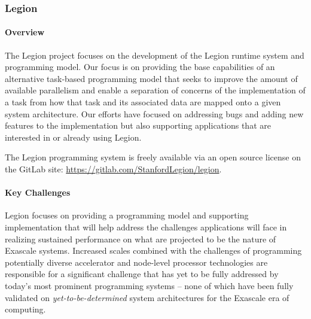 \subsubsection{ Legion}

\paragraph{Overview}
The Legion project focuses on the development of the Legion runtime system and programming
model. Our focus is on providing the base capabilities of an alternative task-based 
programming model that seeks to improve the amount of available parallelism and enable a 
separation of concerns of the implementation of a task from how that task and its 
associated data are mapped onto a given system architecture.  Our efforts have focused on 
addressing bugs and adding new features to the implementation but also supporting 
applications that are interested in or already using Legion. 

The Legion programming system is freely available via an open source license on the GitLab
site: \url{https://gitlab.com/StanfordLegion/legion}.

\paragraph{Key Challenges}
Legion focuses on providing a programming model and supporting implementation that will 
help address the challenges applications will face in realizing sustained performance on
what are projected to be the nature of Exascale systems. Increased scales combined with 
the challenges of programming potentially diverse accelerator and node-level processor 
technologies are responsible for a significant challenge that has yet to be fully addressed
by today's most prominent programming systems -- none of which have been fully validated 
on \emph{yet-to-be-determined} system architectures for the Exascale era of computing. 

